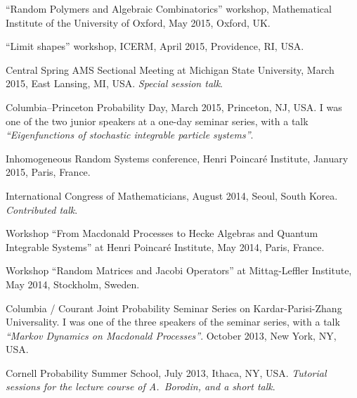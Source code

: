 \documentclass[letterpaper,11pt]{article}
\begin{document}
\begin{etaremune}
	\item
	      ``Random Polymers and Algebraic Combinatorics'' workshop,
	      Mathematical Institute of the University of Oxford, May 2015,
	      Oxford, UK.

	\item
	      ``Limit shapes'' workshop, ICERM, April 2015, Providence, RI,
	      USA.   %

	\item
	      Central Spring AMS Sectional Meeting at Michigan State
	      University, March 2015, East Lansing, MI, USA. \emph{Special session talk}.

	\item
	      Columbia--Princeton Probability Day, March 2015, Princeton, NJ,
	      USA. I was one of the two junior speakers at a one-day seminar series, with a
	      talk \emph{``Eigenfunctions of stochastic integrable particle systems''}.

	\item
	      Inhomogeneous Random Systems conference, Henri Poincar\'e
	      Institute, January 2015, Paris, France.

	\item
	      International Congress of Mathematicians, August 2014, Seoul,
	      South Korea. \emph{Contributed talk}.

	\item
	      Workshop ``From Macdonald Processes to Hecke Algebras and
	      Quantum Integrable Systems'' at Henri Poincar\'e Institute, May 2014, Paris,
	      France.

	\item
	      Workshop ``Random Matrices and Jacobi Operators'' at
	      Mittag-Leffler Institute, May 2014, Stockholm, Sweden.

	\item
	      Columbia / Courant Joint Probability Seminar Series on
	      Kardar-Parisi-Zhang Universality. I was one of the three speakers of the
	      seminar series, with a talk \emph{``Markov Dynamics on Macdonald Processes''}.
	      October 2013, New York, NY, USA.

	\item
	      Cornell Probability Summer School, July 2013, Ithaca, NY, USA.
	      \emph{Tutorial sessions for the lecture course of A.~Borodin, and a short
		      talk}.


\end{etaremune}
\end{document}
